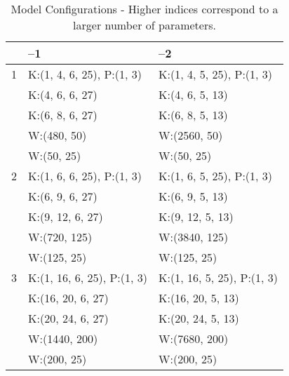 \begin{table}[!t]
\renewcommand{\arraystretch}{1.4}
\caption{Model Configurations - Higher indices correspond to a larger number of parameters.}
\label{table:model_configs}
\centering
\begin{tabular}{c || l || l |}
 & --1 & --2 \\
\hline
 1 & K:(1, 4, 6, 25), P:(1, 3)& K:(1, 4, 5, 25), P:(1, 3)\\
 &K:(4, 6, 6, 27) & K:(4, 6, 5, 13) \\
 &K:(6, 8, 6, 27) & K:(6, 8, 5, 13) \\
 &W:(480, 50)  & W:(2560, 50)\\
 &W:(50, 25)  & W:(50, 25)\\
\hline
 2 & K:(1, 6, 6, 25), P:(1, 3)& K:(1, 6, 5, 25), P:(1, 3)\\
 &K:(6, 9, 6, 27) & K:(6, 9, 5, 13) \\
 &K:(9, 12, 6, 27) & K:(9, 12, 5, 13) \\
 &W:(720, 125)  & W:(3840, 125)\\
 &W:(125, 25)  & W:(125, 25)\\
\hline
 3 & K:(1, 16, 6, 25), P:(1, 3)& K:(1, 16, 5, 25), P:(1, 3)\\
 &K:(16, 20, 6, 27) & K:(16, 20, 5, 13) \\
 &K:(20, 24, 6, 27) & K:(20, 24, 5, 13) \\
 &W:(1440, 200)  & W:(7680, 200)\\
 &W:(200, 25)  & W:(200, 25)\\
\hline
\end{tabular}
\end{table}


